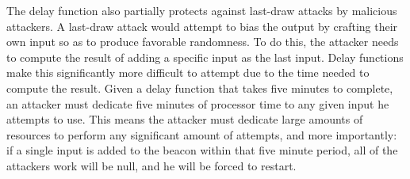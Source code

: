 The delay function also partially protects against last-draw attacks by malicious attackers. A last-draw attack would attempt to bias the output by crafting their own input so as to produce favorable randomness. To do this, the attacker needs to compute the result of adding a specific input as the last input. Delay functions make this significantly more difficult to attempt due to the time needed to compute the result. Given a delay function that takes five minutes to complete, an attacker must dedicate five minutes of processor time to any given input he attempts to use. This means the attacker must dedicate large amounts of resources to perform any significant amount of attempts, and more importantly: if a single input is added to the beacon within that five minute period, all of the attackers work will be null, and he will be forced to restart.

